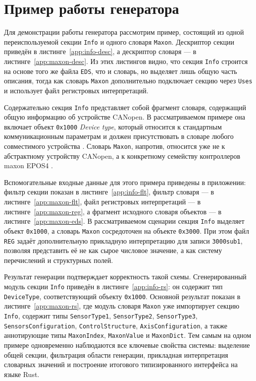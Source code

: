 \documentclass[a4paper,12pt]{article}
\begin{document}
\pagebreak

\section{Пример работы генератора}

Для демонстрации работы генератора рассмотрим пример, состоящий из одной
переиспользуемой секции \texttt{Info} и одного словаря \texttt{Maxon}. Дескриптор
секции приведён в листинге~\ref{app:info-desc}, а дескриптор словаря ---
в листинге~\ref{app:maxon-desc}. Из этих листингов видно, что секция
\texttt{Info} строится на основе того же файла \texttt{EDS}, что и словарь, но
выделяет лишь общую часть описания, тогда как словарь \texttt{Maxon}
дополнительно подключает секцию через \texttt{Uses} и использует файл
регистровых интерпретаций.

Содержательно секция \texttt{Info} представляет собой фрагмент словаря, содержащий
общую информацию об устройстве CANopen. В рассматриваемом примере она включает объект
\texttt{0x1000} \textit{Device type}, который относится к стандартным коммуникационным
параметрам и должен присутствовать в словаре любого совместимого устройства
\cite{cia_301_2011}. Словарь \texttt{Maxon}, напротив, относится уже не к абстрактному
устройству CANopen, а к конкретному семейству контроллеров maxon EPOS4
\cite{maxon_epos4_firmware,maxon_epos4_control_2024}.

Вспомогательные входные данные для этого примера приведены в приложении:
фильтр секции показан в листинге~\ref{app:info-flt}, фильтр словаря ---
в листинге~\ref{app:maxon-flt}, файл регистровых интерпретаций ---
в листинге~\ref{app:maxon-reg}, а фрагмент исходного словаря объектов ---
в листинге~\ref{app:maxon-eds}. В рассматриваемом сценарии секция
\texttt{Info} выделяет объект \texttt{0x1000}, а словарь \texttt{Maxon}
сосредоточен на объекте \texttt{0x3000}. При этом файл \texttt{REG} задаёт
дополнительную прикладную интерпретацию для записи \texttt{3000sub1},
позволяя представить её не как сырое числовое значение, а как систему
перечислений и структурных полей.

Результат генерации подтверждает корректность такой схемы. Сгенерированный
модуль секции \texttt{Info} приведён в листинге~\ref{app:info-rs}: он содержит
тип \texttt{DeviceType}, соответствующий объекту \texttt{0x1000}. Основной
результат показан в листинге~\ref{app:maxon-rs}, где модуль словаря
\texttt{Maxon} уже импортирует секцию \texttt{Info}, содержит типы
\texttt{SensorType1}, \texttt{SensorType2}, \texttt{SensorType3},
\texttt{SensorsConfiguration}, \texttt{ControlStructure},
\texttt{AxisConfiguration}, а также аннотирующие типы \texttt{MaxonIndex},
\texttt{MaxonValue} и \texttt{MaxonDict}. Тем самым на одном примере
одновременно наблюдаются все ключевые свойства системы: выделение общей
секции, фильтрация области генерации, прикладная интерпретация словарных
значений и построение итогового типизированного интерфейса на языке Rust.
\end{document}
